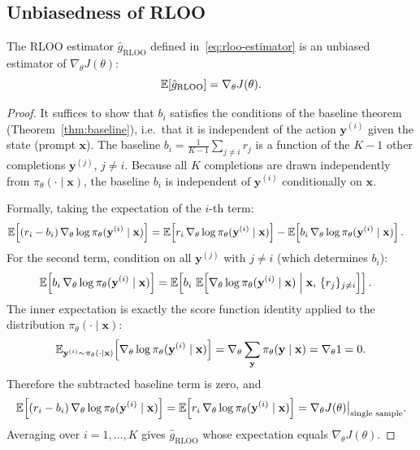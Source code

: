 \subsection{Unbiasedness of RLOO}

\begin{theorem}
\label{thm:rloo-unbiased}
The RLOO estimator $\hat g_{\text{RLOO}}$ defined in~\eqref{eq:rloo-estimator} is an unbiased estimator of $\nabla_\theta J(\theta)$:
\[
\operatorname{\mathbb{E}}\!\left[\hat g_{\text{RLOO}}\right] = \nabla_\theta J(\theta).
\]
\end{theorem}

\begin{proof}
It suffices to show that $b_i$ satisfies the conditions of the baseline theorem (Theorem~\ref{thm:baseline}), i.e.\ that it is independent of the action $\mathbf{y}^{(i)}$ given the state (prompt $\mathbf{x}$).  The baseline $b_i = \frac{1}{K-1}\sum_{j \neq i} r_j$ is a function of the $K-1$ other completions $\mathbf{y}^{(j)}$, $j \neq i$.  Because all $K$ completions are drawn independently from $\pi_\theta(\cdot \mid \mathbf{x})$, the baseline $b_i$ is independent of $\mathbf{y}^{(i)}$ conditionally on $\mathbf{x}$.

Formally, taking the expectation of the $i$-th term:
\begin{align*}
\operatorname{\mathbb{E}}\!\left[(r_i - b_i)\, \nabla_\theta \log \pi_\theta(\mathbf{y}^{(i)} \mid \mathbf{x})\right]
&= \operatorname{\mathbb{E}}\!\left[r_i\, \nabla_\theta \log \pi_\theta(\mathbf{y}^{(i)} \mid \mathbf{x})\right]
 - \operatorname{\mathbb{E}}\!\left[b_i\, \nabla_\theta \log \pi_\theta(\mathbf{y}^{(i)} \mid \mathbf{x})\right].
\end{align*}
For the second term, condition on all $\mathbf{y}^{(j)}$ with $j \neq i$ (which determines $b_i$):
\begin{align*}
\operatorname{\mathbb{E}}\!\left[b_i\, \nabla_\theta \log \pi_\theta(\mathbf{y}^{(i)} \mid \mathbf{x})\right]
&= \operatorname{\mathbb{E}}\!\left[b_i\, \operatorname{\mathbb{E}}\!\left[\nabla_\theta \log \pi_\theta(\mathbf{y}^{(i)} \mid \mathbf{x}) \;\middle|\; \mathbf{x},\, \{r_j\}_{j \neq i}\right]\right].
\end{align*}
The inner expectation is exactly the score function identity applied to the distribution $\pi_\theta(\cdot \mid \mathbf{x})$:
\[
\operatorname{\mathbb{E}}_{\mathbf{y}^{(i)} \sim \pi_\theta(\cdot \mid \mathbf{x})}\!\left[\nabla_\theta \log \pi_\theta(\mathbf{y}^{(i)} \mid \mathbf{x})\right] = \nabla_\theta \sum_{\mathbf{y}} \pi_\theta(\mathbf{y} \mid \mathbf{x}) = \nabla_\theta 1 = 0.
\]
Therefore the subtracted baseline term is zero, and
\[
\operatorname{\mathbb{E}}\!\left[(r_i - b_i)\, \nabla_\theta \log \pi_\theta(\mathbf{y}^{(i)} \mid \mathbf{x})\right]
= \operatorname{\mathbb{E}}\!\left[r_i\, \nabla_\theta \log \pi_\theta(\mathbf{y}^{(i)} \mid \mathbf{x})\right]
= \nabla_\theta J(\theta)\big|_{\text{single sample}}.
\]
Averaging over $i = 1, \ldots, K$ gives $\hat g_{\text{RLOO}}$ whose expectation equals $\nabla_\theta J(\theta)$.
\end{proof}

